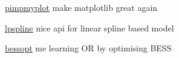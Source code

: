 \begin{cvskills}


  \cvskill
    {\href{https://github.com/clarkmaio/pimpmyplot}{pimpmyplot}}
    {make matplotlib great again}

  \cvskill
    {{\href{https://github.com/clarkmaio/lpspline}{lpspline}}} 
    {nice api for linear spline based model}

  \cvskill
    {{\href{https://github.com/clarkmaio/bessopt}{bessopt}}}  
    {me learning OR by optimising BESS} 

\end{cvskills}
